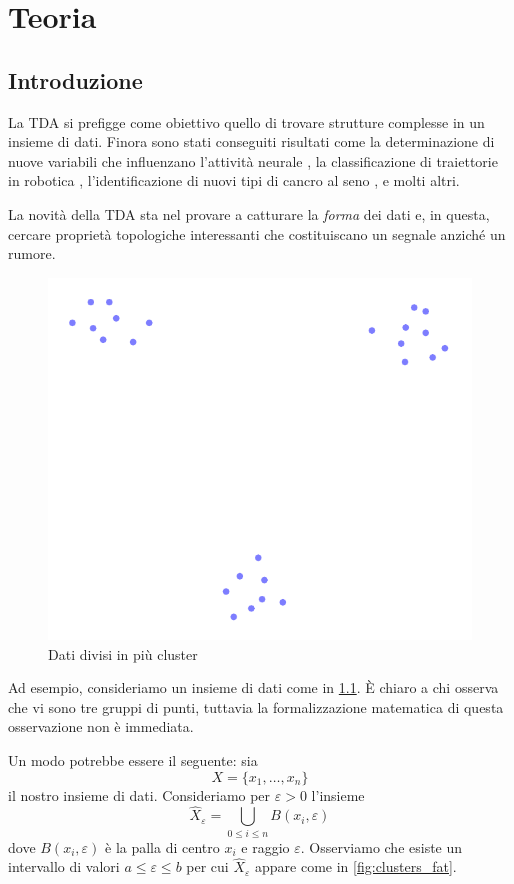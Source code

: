 \chapter{Teoria}\label{ch:teoria}
\section{Introduzione}

La TDA si prefigge come obiettivo quello di trovare strutture complesse in un insieme di dati. Finora sono stati conseguiti risultati come la determinazione di nuove variabili che influenzano l'attività neurale \cite{Spreemann2015}, la classificazione di traiettorie in robotica \cite{Pokorny2014}, l'identificazione di nuovi tipi di cancro al seno \cite{Lum2013}, e molti altri.

La novità della TDA sta nel provare a catturare la \emph{forma} dei dati e, in questa, cercare proprietà topologiche interessanti che costituiscano un segnale anziché un rumore.

\begin{figure}[h]
  \begin{center}
    \includegraphics[width=.4\linewidth]{gfx/three_clusters_small.pdf}
    \caption{Dati divisi in più cluster}
    \label{fig:clusters}
  \end{center}
\end{figure}

Ad esempio, consideriamo un insieme di dati come in \cref{fig:clusters}. È chiaro a chi osserva che vi sono tre gruppi di punti, tuttavia la formalizzazione matematica di questa osservazione non è immediata.

Un modo potrebbe essere il seguente: sia
\begin{equation*}
  X=\{x_1,\dots, x_n\}
\end{equation*}
il nostro insieme di dati. Consideriamo per $\varepsilon>0$ l'insieme
\begin{equation*}
  \widehat{X}_\varepsilon=\bigcup_{0\leq i\leq n} B(x_i,\varepsilon)
\end{equation*}
dove $B(x_i,\varepsilon)$ è la palla di centro $x_i$ e raggio $\varepsilon$. Osserviamo che esiste un intervallo di valori $a \leq \varepsilon \leq b$ per cui $\widehat{X}_\varepsilon$ appare come in \cref{fig:clusters_fat}.

